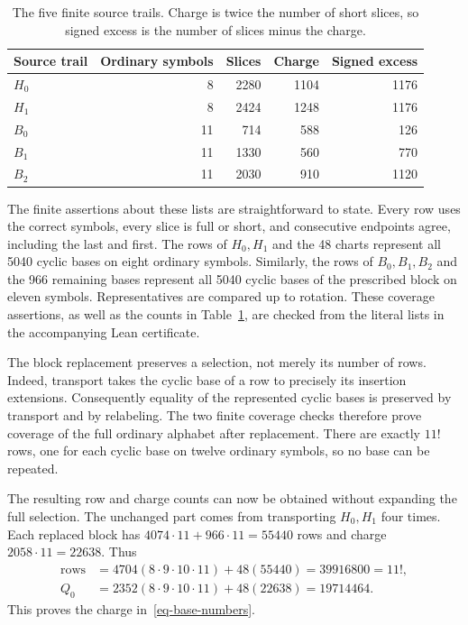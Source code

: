 \documentclass[11pt]{article}
\begin{document}
\begin{table}[ht]
\centering
\begin{tabular}{lrrrr}
\toprule
Source trail & Ordinary symbols & Slices & Charge & Signed excess\\
\midrule
$H_0$ & 8 & 2280 & 1104 & 1176\\
$H_1$ & 8 & 2424 & 1248 & 1176\\
\addlinespace
$B_0$ & 11 & 714 & 588 & 126\\
$B_1$ & 11 & 1330 & 560 & 770\\
$B_2$ & 11 & 2030 & 910 & 1120\\
\bottomrule
\end{tabular}
\caption{The five finite source trails. Charge is twice the number of
short slices, so signed excess is the number of slices minus the charge.}
\label{tab-sources}
\end{table}

The finite assertions about these lists are straightforward to state.
Every row uses the correct symbols, every slice is full or short, and
consecutive endpoints agree, including the last and first. The rows of
$H_0,H_1$ and the 48 charts represent all 5040 cyclic bases on eight
ordinary symbols. Similarly, the rows of $B_0,B_1,B_2$ and the 966
remaining bases represent all 5040 cyclic bases of the prescribed block
on eleven symbols. Representatives are compared up to rotation. These
coverage assertions, as well as the counts in Table~\ref{tab-sources},
are checked from the literal lists in the accompanying Lean certificate.

The block replacement preserves a selection, not merely its number of
rows. Indeed, transport takes the cyclic base of a row to precisely its
insertion extensions. Consequently equality of the represented cyclic
bases is preserved by transport and by relabeling. The two finite
coverage checks therefore prove coverage of the full ordinary alphabet
after replacement. There are exactly $11!$ rows, one for each cyclic
base on twelve ordinary symbols, so no base can be repeated.

The resulting row and charge counts can now be obtained without expanding
the full selection. The unchanged part comes from transporting $H_0,H_1$
four times. Each replaced block has
$4074\cdot11+966\cdot11=\num{55440}$ rows and charge
$2058\cdot11=\num{22638}$. Thus
\[
 \begin{aligned}
 \text{rows}&=4704(8\cdot9\cdot10\cdot11)+48(55440)
             =\num{39916800}=11!,\\
 Q_0&=2352(8\cdot9\cdot10\cdot11)+48(22638)
             =\num{19714464}.
 \end{aligned}
\]
This proves the charge in~\eqref{eq-base-numbers}.
\end{document}
